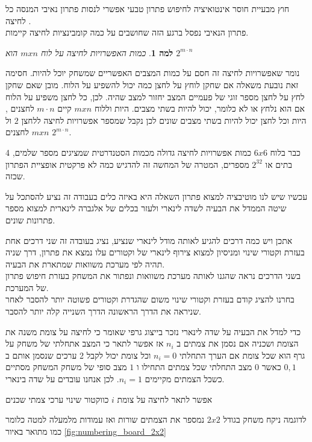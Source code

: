 \documentclass[12pt,twoside]{article}
\newtheorem{lemma}{למה}[section]
\begin{document}
חוץ מבעיית חוסר אינטואיציה לחיפוש פתרון  טבעי אפשרי לנסות
פתרון נאיבי המנסה כל לחיצה .
\\
פתרון הנאיבי נפסל ברגע הזה שחושבים על כמה קומבינציות לחיצה קיימות.

\begin{lemma}
    כמות האפשרויות לחיצה על לוח
    $mxn$
    הוא 
    $2^{m \cdot n}$
\end{lemma}
נומר שאפשרויות לחיצה זה חסם על כמות המצבים האפשריים שמשחק יוכל להיות.
חסימה זאת נובעת משאלה אם שחקן לוחץ על לחצן כמה יכול להשפיע על הלוח.
מובן שאם שחקן לחץ על לחצן מספר זוגי של פעמיים המצב יחזור למצב שהיה.
לכן,
כל לחצן משפיע על הלוח אם הוא נלחץ או לא כלומר, יכול להיות בשתי מצבים.
היות וללוח
$mxn$
קיים 
$m \cdot n$
לחצנים
,
היות וכל לחצן 
יכול להיות בשתי מצבים שונים
לכן נקבל 
שמספר אפשרויות לחיצה 
ללחצן 
$2$
ול
$m x n$
לחצנים
$2^{m \cdot n}$.

כבר בלוח 
$6x6$
כמות  אפשרויות לחיצה גדולה 
מכמות הסטנדרטית שמציגים מספר שלמים,
4 בתים או 
$2^32$
מספרים,
המטרה של המחשה זה להדגיש כמה לא פרקטית אופציית הפתרון שכזה.

עכשיו שיש לנו מוטיבציה למצוא פתרון השאלה היא באיזה כלים בעבודה זה נציע להסתכל על שיטה
הממדל את הבעיה לשדה לינארי ולעזר בכלים של אלגברה לינארית למצוא מספר פתרונות שונים.


אתכן ויש כמה דרכים להגיע לאותה מודל לינארי שנציע, נציג בעובדה זה שני דרכים אחת 
בעזרת וקטורי שינוי ומניסיון למצוא צירוף לינארי של וקטורים עלו נמצא את פתרון, דרך שניה תהיה
לפי מערכת משוואות שמתארת את הבעיה.
\\
בשני הדרכים נראה שהגנו לאותה מערכת משוואות ונפתור את המשחק בעזרת חיפוש פתרון של המערכת.
\\
בחרנו להציג קודם בעזרת וקטורי שינוי משום שהגדרת וקטורים פשוטה יותר להסבר לאחר שניראה את הדרך הראשונה
הדרך השנייה קלה יותר להסבר.


כדי למדל את הבעיה על שדה לינארי נזכר בייצוג גרפי שאומר כי לחיצה על צומת משנה את הצומת ושכניה 
אם נסמן את צמתים ב
$n_i$
אז אפשר לתאר כי המצב אתחלתי של משחק על גרף הוא שכל צומת אם הערך התחלתי
$n_i = 0$
וכל צומת יכול לקבל 2 ערכים שנסמן אותם ב
${0,1}$
כאשר 
$0$
מצב התחלתי שכל צמתים התחילו 
ו
$1$
מצב סופי של משחק 
המשחק מסתיים כשכל הצמתים מקיימים
$n_i = 1$.
לכן אנחנו עובדים על שדה בינארי.

אפשר לתאר לחיצה על צומת 
$i$
כווקטור שינוי ערכי צמתי שכנים

לדוגמה ניקח 
משחק בגודל
$2x2$
נמספר את הצמתים 
שורות ואז עמודות מלמעלה למטה כלומר כמו מתואר באיור
\ref{fig:numbering_board_2x2}
\end{document}
